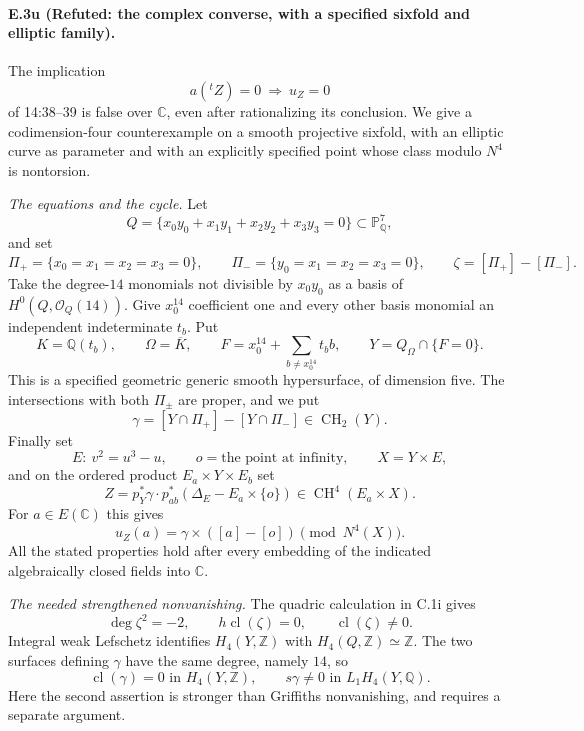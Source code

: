 \paragraph{E.3u (Refuted: the complex converse, with a specified sixfold and elliptic family).}
The implication
\[
                     a({}^tZ)=0\ \Longrightarrow\ u_Z=0
\]
of 14:38--39 is false over $\mathbb C$, even after
rationalizing its conclusion. We give a codimension-four
counterexample on a smooth projective sixfold, with an
elliptic curve as parameter and with an explicitly
specified point whose class modulo $N^4$ is nontorsion.

\emph{The equations and the cycle.}
Let
\[
 Q=\{x_0y_0+x_1y_1+x_2y_2+x_3y_3=0\}
                  \subset\mathbb P^7_{\mathbb Q},
\]
and set
\[
 \Pi_+=\{x_0=x_1=x_2=x_3=0\},\qquad
 \Pi_-=\{y_0=x_1=x_2=x_3=0\},\qquad
 \zeta=[\Pi_+]-[\Pi_-].
\]
Take the degree-$14$ monomials not divisible by $x_0y_0$
as a basis of $H^0(Q,\mathcal O_Q(14))$. Give $x_0^{14}$
coefficient one and every other basis monomial an
independent indeterminate $t_b$. Put
\[
 K=\mathbb Q(t_b),\qquad \Omega=\overline K,
 \qquad F=x_0^{14}+\sum_{b\ne x_0^{14}}t_b b,
 \qquad Y=Q_\Omega\cap\{F=0\}.
\]
This is a specified geometric generic smooth hypersurface,
of dimension five. The intersections with both $\Pi_\pm$
are proper, and we put
\[
 \gamma=[Y\cap\Pi_+]-[Y\cap\Pi_-]
                   \in\operatorname{CH}_2(Y).
\]
Finally set
\[
 E:\ v^2=u^3-u,\qquad o=\text{the point at infinity},
 \qquad X=Y\times E,
\]
and on the ordered product $E_a\times Y\times E_b$ set
\begin{equation}\label{eq:E3-explicit-morphic-family}
 Z=p_Y^*\gamma\cdot p_{ab}^*
                   (\Delta_E-E_a\times\{o\})
             \in\operatorname{CH}^4(E_a\times X).
\end{equation}
For $a\in E(\mathbb C)$ this gives
\[
                 u_Z(a)=\gamma\times([a]-[o])\pmod{N^4(X)}.
\]
All the stated properties hold after every embedding of
the indicated algebraically closed fields into $\mathbb C$.

\emph{The needed strengthened nonvanishing.}
The quadric calculation in C.1i gives
\[
 \deg\zeta^2=-2,
 \qquad h\operatorname{cl}(\zeta)=0,
 \qquad \operatorname{cl}(\zeta)\ne0.
\]
Integral weak Lefschetz identifies $H_4(Y,\mathbb Z)$
with $H_4(Q,\mathbb Z)\simeq\mathbb Z$. The two
surfaces defining $\gamma$ have the same degree, namely
$14$, so
\begin{equation}\label{eq:E3-gamma-lawson}
 \operatorname{cl}(\gamma)=0\text{ in }H_4(Y,\mathbb Z),
 \qquad
 s\gamma\ne0\text{ in }L_1H_4(Y,\mathbb Q).
\end{equation}
Here the second assertion is stronger than Griffiths
nonvanishing, and requires a separate argument.


